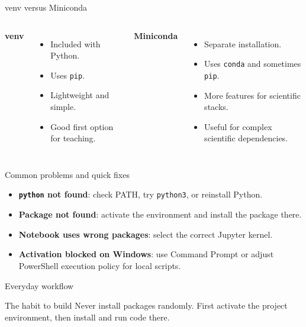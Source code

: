\documentclass[aspectratio=169]{beamer}
\newcommand{\coursefooter}{}
\begin{document}
\begin{frame}{venv versus Miniconda}
\begin{columns}[T]
\textbf{venv}
\begin{itemize}
\item Included with Python.
\item Uses \texttt{pip}.
\item Lightweight and simple.
\item Good first option for teaching.
\end{itemize}
\textbf{Miniconda}
\begin{itemize}
\item Separate installation.
\item Uses \texttt{conda} and sometimes \texttt{pip}.
\item More features for scientific stacks.
\item Useful for complex scientific dependencies.
\end{itemize}
\end{columns}
\coursefooter
\end{frame}

\begin{frame}{Common problems and quick fixes}
\begin{itemize}
\item \textbf{\texttt{python} not found}: check PATH, try \texttt{python3}, or reinstall Python.
\item \textbf{Package not found}: activate the environment and install the package there.
\item \textbf{Notebook uses wrong packages}: select the correct Jupyter kernel.
\item \textbf{Activation blocked on Windows}: use Command Prompt or adjust PowerShell execution policy for local scripts.
\end{itemize}
\coursefooter
\end{frame}

\begin{frame}{Everyday workflow}
\centering
{}
\vspace{1em}
\begin{block}{The habit to build}
Never install packages randomly. First activate the project environment, then install and run code there.
\end{block}
\coursefooter
\end{frame}
\end{document}
